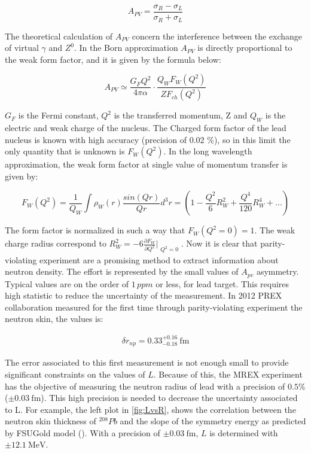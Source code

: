 \begin{equation}
A_{PV} = \dfrac{\sigma_{R} - \sigma_{L}}{\sigma_{R} + \sigma_{L}}
\end{equation} 

The theoretical calculation of $A_{PV}$ concern the interference between the exchange of virtual $\gamma$ and $Z^{0}$. In the Born approximation $A_{PV}$ is directly proportional to the weak form factor, and it is given by the formula below:

\begin{equation}
A_{PV} \simeq \dfrac{G_{F} Q^{2}}{4 \pi \alpha} \cdot \dfrac{Q_{W} F_{W}(Q^{2})}{Z F_{ch}(Q^{2})}
\end{equation} 

$G_{F}$ is the Fermi constant, $Q^{2}$ is the transferred momentum, Z and $Q_{W}$ is the electric and weak charge of the nucleus. The Charged form factor of the lead nucleus is known with high accuracy (precision of 0.02 \%), so in this limit the only quantity that is unknown is $F_{W}(Q^{2})$. In the long wavelength approximation, the weak form factor at single value of momentum transfer is given by:

\begin{equation}
F_{W}(Q^{2}) = \frac{1}{Q_{W}} \int \rho_{W}(r) \dfrac{sin(Qr)}{Qr} d^{3}r = (1 - \frac{Q^{2}}{6} R^{2}_{W} + \frac{Q^{4}}{120}R^{4}_{W} + ...)  
\end{equation}

The form factor is normalized in such a way that $F_{W}(Q^{2} = 0) = 1$. The weak charge radius correspond to $R^{2}_{W} = -6 \frac{\partial F_{W}}{\partial Q^{2}}\Bigr|_{\substack{Q^{2} = 0}}$. Now it is clear that parity-violating experiment are a promising method to extract information about neutron density. The effort is represented by the small values of $A_{pv}$ asymmetry. Typical values are on the order of $1 \, ppm$ or less, for lead target. This requires high statistic to reduce the uncertainty of the measurement. 
In 2012 PREX collaboration measured for the first time through parity-violating experiment the neutron skin, the values is:

\begin{align*}
\delta r_{np} = 0.33^{+0.16}_{-0.18} \SI{}{\femto \meter}
\end{align*}

The error associated to this first measurement is not enough small to provide significant constraints on the values of $L$. Because of this, the MREX experiment has the objective of measuring the neutron radius of lead with a precision of $0.5 \%$  ($\pm \SI{0.03}{\femto \meter}$). This high precision is needed to decrease the uncertainty associated to L. For example, the left plot in \ref{fig:LvsR}, shows the correlation between the neutron skin thickness of $^{208}Pb$ and the slope of the symmetry energy as predicted by FSUGold model (\cite{Fattoyev_2011}). With a precision of $\pm \SI{0.03}{\femto \meter}$, $L$ is determined with $\pm \SI{12.1}{\mega \electronvolt}$.

